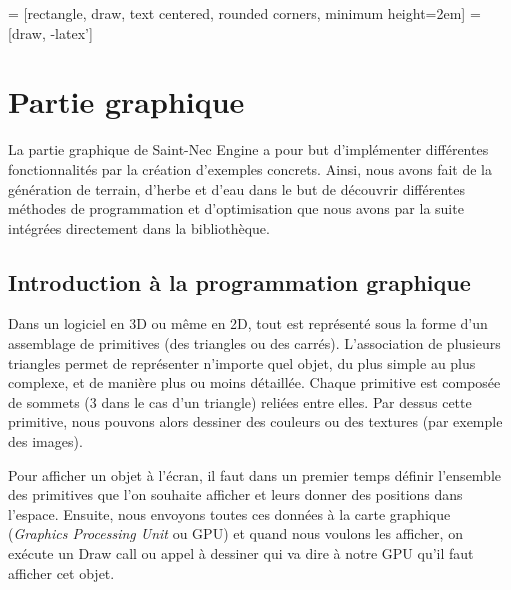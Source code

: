 
 = [rectangle, draw, text centered, rounded corners, minimum height=2em]
 = [draw, -latex']



\section{Partie graphique}

La partie graphique de Saint-Nec Engine a pour but d'implémenter différentes fonctionnalités par la création d'exemples concrets. Ainsi, nous avons fait de la génération de terrain, d'herbe et d'eau dans le but de découvrir différentes méthodes de programmation et d'optimisation que nous avons par la suite intégrées directement dans la bibliothèque.

\subsection{Introduction à la programmation graphique}

Dans un logiciel en 3D ou même en 2D, tout est représenté sous la forme d'un assemblage de primitives (des triangles ou des carrés). L'association de plusieurs triangles permet de représenter n'importe quel objet, du plus simple au plus complexe, et de manière plus ou moins détaillée. Chaque primitive est composée de sommets (3 dans le cas d'un triangle) reliées entre elles. Par dessus cette primitive, nous pouvons alors dessiner des couleurs ou des textures (par exemple des images).

Pour afficher un objet à l'écran, il faut dans un premier temps définir l'ensemble des primitives que l'on souhaite afficher et leurs donner des positions dans l'espace. Ensuite, nous envoyons toutes ces données à la carte graphique (\textit{Graphics Processing Unit} ou GPU) et quand nous voulons les afficher, on exécute un \og Draw call \fg ou appel à dessiner qui va dire à notre GPU qu'il faut afficher cet objet.

